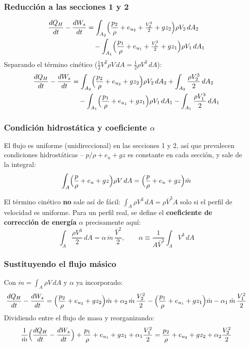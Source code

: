 \documentclass{ltx-talk}
\begin{document}
\begin{frame}
  \frametitle{Reducción a las secciones 1 y 2}
  \begin{align*}
    \frac{dQ_H}{dt} - \frac{dW_s}{dt}
      &= \int_{A_2}\Bigl(\frac{p_2}{\rho}+e_{u_2}+\tfrac{V_2^2}{2}+gz_2\Bigr)\rho V_2\,dA_2 \\
      &\quad - \int_{A_1}\Bigl(\frac{p_1}{\rho}+e_{u_1}+\tfrac{V_1^2}{2}+gz_1\Bigr)\rho V_1\,dA_1
  \end{align*}
  Separando el término cinético ($\tfrac{1}{2}V^2\rho V\,dA = \tfrac{1}{2}\rho V^3\,dA$):
  \begin{align*}
    \frac{dQ_H}{dt} - \frac{dW_s}{dt}
      &= \int_{A_2}\Bigl(\frac{p_2}{\rho}+e_{u_2}+gz_2\Bigr)\rho V_2\,dA_2
         + \int_{A_2} \frac{\rho V_2^3}{2}\,dA_2 \\
      &\quad - \int_{A_1}\Bigl(\frac{p_1}{\rho}+e_{u_1}+gz_1\Bigr)\rho V_1\,dA_1
         - \int_{A_1} \frac{\rho V_1^3}{2}\,dA_1
  \end{align*}
\end{frame}

\begin{frame}
  \frametitle{Condición hidrostática y coeficiente $\alpha$}
  El flujo es uniforme (unidireccional) en las secciones 1 y 2, así que
  prevalecen condiciones hidrostáticas -- $p/\rho + e_u + gz$ es
  constante en cada sección, y sale de la integral:
  \[
    \int_A \Bigl(\frac{p}{\rho}+e_u+gz\Bigr)\rho V\,dA
      = \Bigl(\frac{p}{\rho}+e_u+gz\Bigr)\dot{m}
  \]

  El término cinético \textbf{no} sale así de fácil: $\int_A \rho V^3\,dA
  = \rho \bar{V}^3 A$ solo si el perfil de velocidad es uniforme. Para
  un perfil real, se define el \textbf{coeficiente de corrección de
  energía} $\alpha$ precisamente aquí:
  \[
    \int_A \frac{\rho V^3}{2}\,dA = \alpha\,\dot{m}\,\frac{\bar{V}^2}{2},
    \qquad
    \alpha \equiv \frac{1}{A\bar{V}^3}\int_A V^3\,dA
  \]
\end{frame}

\begin{frame}
  \frametitle{Sustituyendo el flujo másico}
  Con $\dot{m} = \int_A \rho V\,dA$ y $\alpha$ ya incorporado:
  \[
    \frac{dQ_H}{dt} - \frac{dW_s}{dt}
      = \Bigl(\frac{p_2}{\rho}+e_{u_2}+gz_2\Bigr)\dot m + \alpha_2\,\dot m\,\frac{V_2^2}{2}
        - \Bigl(\frac{p_1}{\rho}+e_{u_1}+gz_1\Bigr)\dot m - \alpha_1\,\dot m\,\frac{V_1^2}{2}
  \]
  Dividiendo entre el flujo de masa y reorganizando:
  \[
    \frac{1}{\dot m}\Bigl(\frac{dQ_H}{dt}-\frac{dW_s}{dt}\Bigr)
      + \frac{p_1}{\rho}+e_{u_1}+gz_1+\alpha_1\frac{V_1^2}{2}
      = \frac{p_2}{\rho}+e_{u_2}+gz_2+\alpha_2\frac{V_2^2}{2}
  \]
\end{frame}
\end{document}
